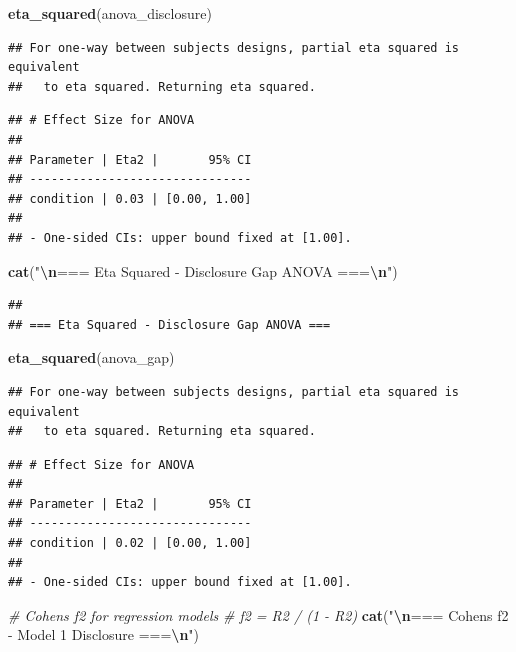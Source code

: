\documentclass[
]{article}
\newenvironment{Shaded}{\begin{snugshade}}{\end{snugshade}}
\newcommand{\CommentTok}[1]{\textcolor[rgb]{0.56,0.35,0.01}{\textit{#1}}}
\newcommand{\FunctionTok}[1]{\textcolor[rgb]{0.13,0.29,0.53}{\textbf{#1}}}
\newcommand{\NormalTok}[1]{#1}
\newcommand{\SpecialCharTok}[1]{\textcolor[rgb]{0.81,0.36,0.00}{\textbf{#1}}}
\newcommand{\StringTok}[1]{\textcolor[rgb]{0.31,0.60,0.02}{#1}}
\begin{document}
\begin{Shaded}
\begin{Highlighting}[]
\FunctionTok{eta\_squared}\NormalTok{(anova\_disclosure)}
\end{Highlighting}
\end{Shaded}

\begin{verbatim}
## For one-way between subjects designs, partial eta squared is equivalent
##   to eta squared. Returning eta squared.
\end{verbatim}

\begin{verbatim}
## # Effect Size for ANOVA
## 
## Parameter | Eta2 |       95% CI
## -------------------------------
## condition | 0.03 | [0.00, 1.00]
## 
## - One-sided CIs: upper bound fixed at [1.00].
\end{verbatim}

\begin{Shaded}
\begin{Highlighting}[]
\FunctionTok{cat}\NormalTok{(}\StringTok{"}\SpecialCharTok{\textbackslash{}n}\StringTok{=== Eta Squared {-} Disclosure Gap ANOVA ===}\SpecialCharTok{\textbackslash{}n}\StringTok{"}\NormalTok{)}
\end{Highlighting}
\end{Shaded}

\begin{verbatim}
## 
## === Eta Squared - Disclosure Gap ANOVA ===
\end{verbatim}

\begin{Shaded}
\begin{Highlighting}[]
\FunctionTok{eta\_squared}\NormalTok{(anova\_gap)}
\end{Highlighting}
\end{Shaded}

\begin{verbatim}
## For one-way between subjects designs, partial eta squared is equivalent
##   to eta squared. Returning eta squared.
\end{verbatim}

\begin{verbatim}
## # Effect Size for ANOVA
## 
## Parameter | Eta2 |       95% CI
## -------------------------------
## condition | 0.02 | [0.00, 1.00]
## 
## - One-sided CIs: upper bound fixed at [1.00].
\end{verbatim}

\begin{Shaded}
\begin{Highlighting}[]
\CommentTok{\# Cohen\textquotesingle{}s f2 for regression models}
\CommentTok{\# f2 = R2 / (1 {-} R2)}
\FunctionTok{cat}\NormalTok{(}\StringTok{"}\SpecialCharTok{\textbackslash{}n}\StringTok{=== Cohen\textquotesingle{}s f2 {-} Model 1 Disclosure ===}\SpecialCharTok{\textbackslash{}n}\StringTok{"}\NormalTok{)}
\end{Highlighting}
\end{Shaded}
\end{document}
